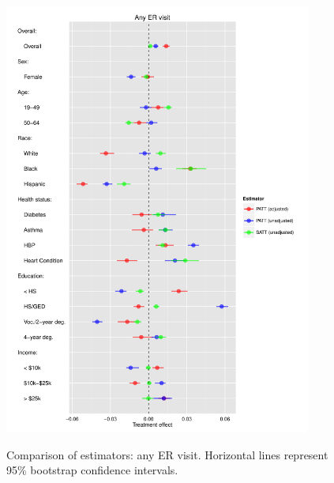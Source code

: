 \documentclass[12pt]{article}
\begin{document}
\begin{appendices}
\begin{figure}[htbp]
\begin{center}
\includegraphics[width = 0.9\textwidth]{any-visit-plot.pdf}
\label{fig:any-visit-plot}
    \caption{Comparison of estimators: any ER visit. Horizontal lines represent 95\% bootstrap confidence intervals.}
\end{center}
\end{figure}


\end{appendices}
\end{document}
